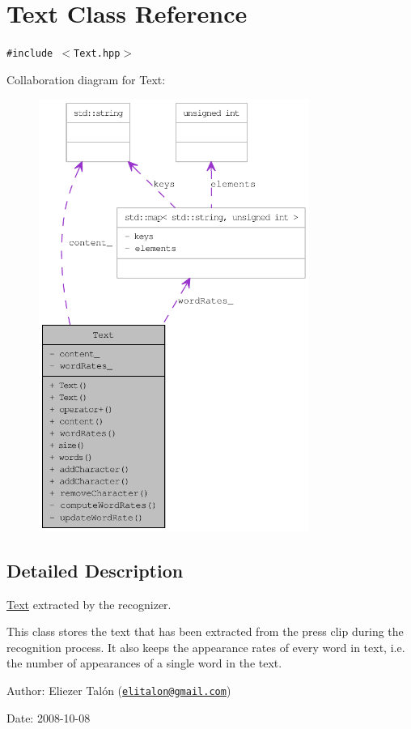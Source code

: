 \hypertarget{class_text}{
\section{Text Class Reference}
\label{class_text}
}
{\tt \#include $<$Text.hpp$>$}

Collaboration diagram for Text:\nopagebreak
\begin{figure}[H]
\begin{center}
\leavevmode
\includegraphics[height=400pt]{class_text__coll__graph}
\end{center}
\end{figure}


\subsection{Detailed Description}
\hyperlink{class_text}{Text} extracted by the recognizer. 

This class stores the text that has been extracted from the press clip during the recognition process. It also keeps the appearance rates of every word in text, i.e. the number of appearances of a single word in the text.

\begin{Desc}
\item[Author:]Eliezer Talón (\href{mailto:elitalon@gmail.com}{\tt elitalon@gmail.com}) \end{Desc}
\begin{Desc}
\item[Date:]2008-10-08 \end{Desc}


